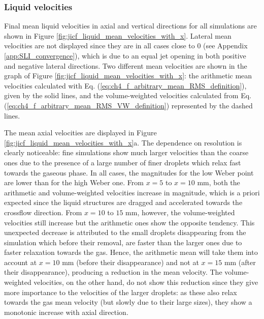 \subsubsection*{Liquid velocities}

Final mean liquid velocities in axial and vertical directions for all simulations are shown in Figure \ref{fig:jicf_liquid_mean_velocities_with_x}. Lateral mean velocities are not displayed since they are in all cases close to 0 (see Appendix \ref{app:SLI_convergence}), which is due to an equal jet opening in both positive and negative lateral directions. Two different mean velocities are shown in the graph of Figure \ref{fig:jicf_liquid_mean_velocities_with_x}: the arithmetic mean velocities calculated with Eq. (\ref{eq:ch4_f_arbitrary_mean_RMS_definition}), given by the solid lines, and the volume-weighted velocities calculated from Eq. (\ref{eq:ch4_f_arbitrary_mean_RMS_VW_definition}) represented by the dashed lines.

The mean axial velocities are displayed in Figure \ref{fig:jicf_liquid_mean_velocities_with_x}a. The dependence on resolution is clearly noticeable: fine simulations show much larger velocities than the coarse ones due to the presence of a large number of finer droplets which relax fast towards the gaseous phase. In all cases, the magnitudes for the low Weber point are lower than for the high Weber one. From $x = 5$ to $x = 10$ mm, both the arithmetic and volume-weighted velocities increase in magnitude, which is a priori expected since the liquid structures are dragged and accelerated towards the crossflow direction. From $x = 10$ to $15$ mm, however, the volume-weighted velocities still increase but the arithmetic ones show the opposite tendency. This unexpected decrease is attributed to the small droplets disappearing from the simulation which before their removal, are faster than the larger ones due to faster relaxation towards the gas. Hence, the arithmetic mean will take them into account at $x = 10$ mm (before their disappearance) and not at $x = 15$ mm (after their disappearance), producing a reduction in the mean velocity. The volume-weighted velocities, on the other hand, do not show this reduction since they give more importance to the velocities of the larger droplets: as these also relax towards the gas mean velocity (but slowly due to their large sizes), they show a monotonic increase with axial direction. %





